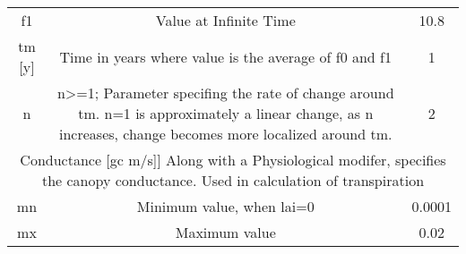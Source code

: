 \begin{tabular}{|c|c|c|}
f1 & Value at Infinite Time & 10.8\\
tm [y] & Time in years where value is the average of f0 and f1 & 1\\
n  & n>=1; Parameter specifing the rate of change around tm.  n=1 is approximately a linear change, as n increases, change becomes more localized around tm. & 2\\
\hline
\multicolumn{3}{|c|}{Conductance [gc m/s]]  Along with a Physiological modifer, specifies the canopy conductance.  Used in calculation of transpiration}\\
mn & Minimum value, when lai=0 & 0.0001\\
mx & Maximum value & 0.02\\
\hline

\end{tabular}

